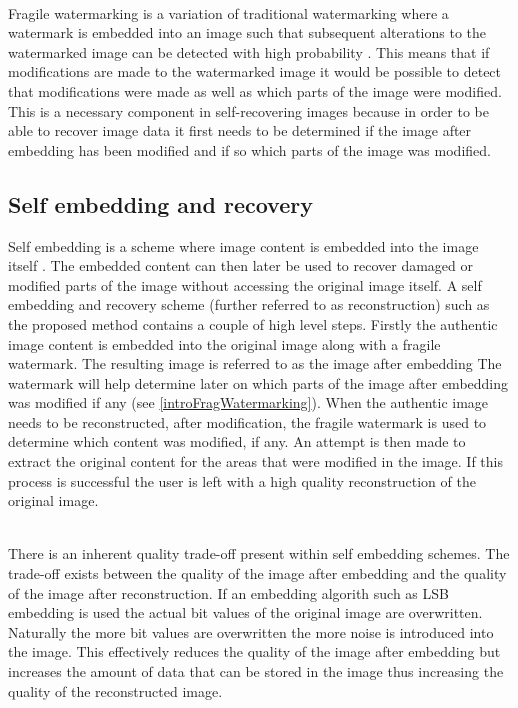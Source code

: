 \documentclass[12pt]{article}
\begin{document}
\hspace{0pt} \\
Fragile watermarking is a variation of traditional watermarking where a watermark is embedded into an image such that subsequent alterations to the watermarked image can be detected with high probability \cite{lin1999review}.
This means that if modifications are made to the watermarked image it would be possible to detect that modifications were made as well as which parts of the image were modified.
This is a necessary component in self-recovering images because in order to be able to recover image data it first needs to be determined if the image after embedding has been modified and if so which parts of the image was modified.

\subsection{Self embedding and recovery}
\label{introSelfEmbedRecovery}
Self embedding is a scheme where image content is embedded into the image itself \cite{fridrich1999images}. The embedded content can then later be used to recover damaged or modified parts of the image without accessing the original image itself.
A self embedding and recovery scheme (further referred to as reconstruction) such as the proposed method contains a couple of high level steps.
Firstly the authentic image content is embedded into the original image along with a fragile watermark.
The resulting image is referred to as the image after embedding
The watermark will help determine later on which parts of the image after embedding was modified if any (see \ref{introFragWatermarking}).
When the authentic image needs to be reconstructed, after modification, the fragile watermark is used to determine which content was modified, if any.
An attempt is then made to extract the original content for the areas that were modified in the image.
If this process is successful the user is left with a high quality reconstruction of the original image.

\hspace{0pt} \\
There is an inherent quality trade-off present within self embedding schemes.
The trade-off exists between the quality of the  image after embedding and the quality of the image after reconstruction.
If an embedding algorith such as LSB embedding is used the actual bit values of the original image are overwritten.
Naturally the more bit values are overwritten the more noise is introduced into the image.
This effectively reduces the quality of the image after embedding but increases the amount of data that can be stored in the image thus increasing the quality of the reconstructed image.
\end{document}
